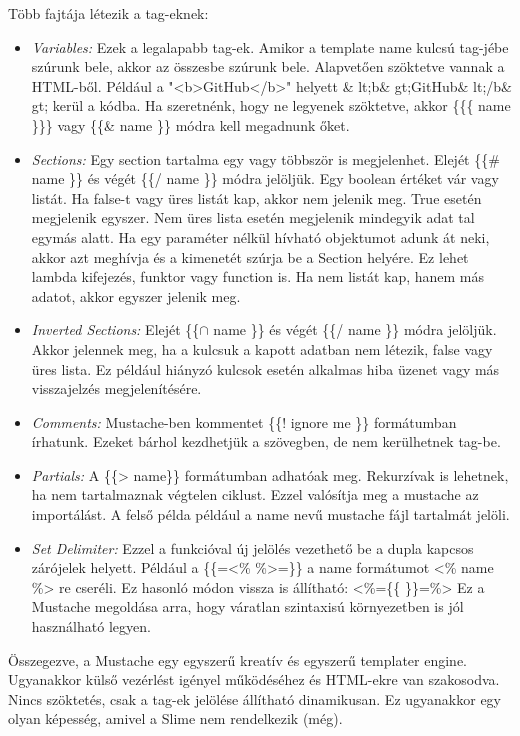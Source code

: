 Több fajtája létezik a tag-eknek:
\begin{itemize}
\item \emph{Variables:}
Ezek a legalapabb tag-ek.
Amikor a template name kulcsú tag-jébe szúrunk bele, akkor az összesbe szúrunk bele.
Alapvetően szöktetve vannak a HTML-ből.
Például a "<b>GitHub</b>" helyett \& lt;b\& gt;GitHub\& lt;/b\& gt; kerül a kódba.
Ha szeretnénk, hogy ne legyenek szöktetve, akkor \{\{\{ name \}\}\} vagy \{\{\& name \}\} módra kell megadnunk őket.
\item \emph{Sections:}
Egy section tartalma egy vagy többször is megjelenhet.
Elejét \{\{\# name \}\} és végét \{\{/ name \}\} módra jelöljük.
Egy boolean értéket vár vagy listát.
Ha false-t vagy üres listát kap, akkor nem jelenik meg.
True esetén megjelenik egyszer.
Nem üres lista esetén megjelenik mindegyik adat tal egymás alatt.
Ha egy paraméter nélkül hívható objektumot adunk át neki, akkor azt meghívja és a kimenetét szúrja be a Section helyére.
Ez lehet lambda kifejezés, funktor vagy function is.
Ha nem listát kap, hanem más adatot, akkor egyszer jelenik meg.
\item \emph{Inverted Sections:}
Elejét \{\{$\cap$ name \}\} és végét \{\{/ name \}\} módra jelöljük.
Akkor jelennek meg, ha a kulcsuk a kapott adatban nem létezik, false vagy üres lista.
Ez például hiányzó kulcsok esetén alkalmas hiba üzenet vagy más visszajelzés megjelenítésére.
\item \emph{Comments:}
Mustache-ben kommentet \{\{! ignore me \}\} formátumban írhatunk.
Ezeket bárhol kezdhetjük a szövegben, de nem kerülhetnek tag-be.
\item \emph{Partials:}
A \{\{> name\}\} formátumban adhatóak meg.
Rekurzívak is lehetnek, ha nem tartalmaznak végtelen ciklust.
Ezzel valósítja meg a mustache az importálást.
A felső példa például a name nevű mustache fájl tartalmát jelöli.
\item \emph{Set Delimiter:}
Ezzel a funkcióval új jelölés vezethető be a dupla kapcsos zárójelek helyett.
Például a \{\{=<\% \%>=\}\} a {{ name }} formátumot <\% name \%> re cseréli.
Ez hasonló módon vissza is állítható: <\%=\{\{ \}\}=\%>
Ez a Mustache megoldása arra, hogy váratlan szintaxisú környezetben is jól használható legyen.
\end{itemize}

Összegezve, a Mustache egy egyszerű kreatív és egyszerű templater engine.
Ugyanakkor külső vezérlést igényel működéséhez és HTML-ekre van szakosodva.
Nincs szöktetés, csak a tag-ek jelölése állítható dinamikusan.
Ez ugyanakkor egy olyan képesség, amivel a Slime nem rendelkezik (még). 



